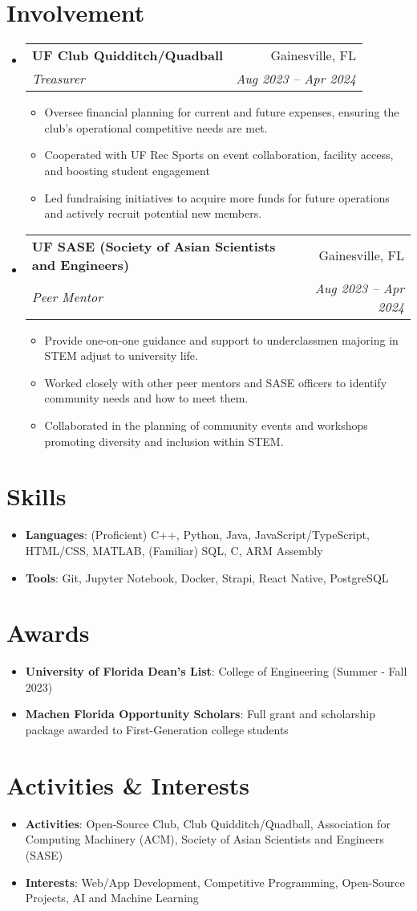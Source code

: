\documentclass[letterpaper,11pt]{article}
\makeatletter
\newcommand{\resumeItemSkills}[2]{
  \item\normalsize{
    \textbf{#1}{: #2 \vspace{-2pt}}
  }
}
\newcommand{\resumeItemExperience}[1]{
  \item\small{
    {#1 \vspace{-2pt}}
  }
}
\newcommand{\resumeSubheading}[4]{
  \vspace{-1pt}\item
    \begin{tabular*}{0.97\textwidth}{l@{\extracolsep{\fill}}r}
      \textbf{#1} & #2 \\
      \textit{\small#3} & \textit{\small #4} \\
    \end{tabular*}\vspace{-6pt}
}
\newcommand{\resumeSubItemSkills}[2]{\resumeItemSkills{#1}{#2}\vspace{-4pt}}
\newcommand{\resumeSubHeadingListStart}{\begin{itemize}[leftmargin=*, label={}]}
\newcommand{\resumeSubHeadingListStartSkillsAwards}{\begin{itemize}[leftmargin=*]}
\newcommand{\resumeSubHeadingListEnd}{\end{itemize}}
\newcommand{\resumeItemListStart}{\begin{itemize}}
\newcommand{\resumeItemListEnd}{\end{itemize}\vspace{-5pt}}
\makeatother
\begin{document}
\section{Involvement}
    \resumeSubHeadingListStart
      \resumeSubheading
        {UF Club Quidditch/Quadball}{Gainesville, FL}
        {Treasurer}{Aug 2023 -- Apr 2024}
        \resumeItemListStart
          \resumeItemExperience
            {Oversee financial planning for current and future expenses, ensuring the club’s operational competitive needs are met.}
          \resumeItemExperience
            {Cooperated with UF Rec Sports on event collaboration, facility access, and boosting student engagement}
          \resumeItemExperience
            {Led fundraising initiatives to acquire more funds for future operations and actively recruit potential new members.}
        \resumeItemListEnd
        \resumeSubheading
        {UF SASE (Society of Asian Scientists and Engineers)}{Gainesville, FL}
        {Peer Mentor}{Aug 2023 -- Apr 2024}
        \resumeItemListStart
          \resumeItemExperience
            {Provide one-on-one guidance and support to underclassmen majoring in STEM adjust to university life.}
          \resumeItemExperience
            {Worked closely with other peer mentors and SASE officers to identify community needs and how to meet them.}
          \resumeItemExperience
            {Collaborated in the planning of community events and workshops promoting diversity and inclusion within STEM.}
        \resumeItemListEnd
    \resumeSubHeadingListEnd
          
\section{Skills}
  \resumeSubHeadingListStartSkillsAwards
    \resumeSubItemSkills{Languages}{(Proficient) C++, Python, Java, JavaScript/TypeScript, HTML/CSS, MATLAB, \newline
    (Familiar) SQL, C, ARM Assembly}
    \resumeSubItemSkills{Tools}{Git, Jupyter Notebook, Docker, Strapi, React Native, PostgreSQL}
  \resumeSubHeadingListEnd

\section{Awards}
  \resumeSubHeadingListStartSkillsAwards
    \resumeSubItemSkills{University of Florida Dean's List}
      {College of Engineering (Summer - Fall 2023)}
    \resumeSubItemSkills{Machen Florida Opportunity Scholars}
      {Full grant and scholarship package awarded to First-Generation college students}
  \resumeSubHeadingListEnd

  \section{Activities \& Interests}
  \resumeSubHeadingListStartSkillsAwards
    \resumeSubItemSkills{Activities}
      {Open-Source Club, Club Quidditch/Quadball, Association for Computing Machinery (ACM), Society of Asian 
      Scientists and Engineers (SASE)}
    \resumeSubItemSkills{Interests}
      {Web/App Development, Competitive Programming, Open-Source Projects, AI and Machine Learning}
  \resumeSubHeadingListEnd
  
\end{document}
